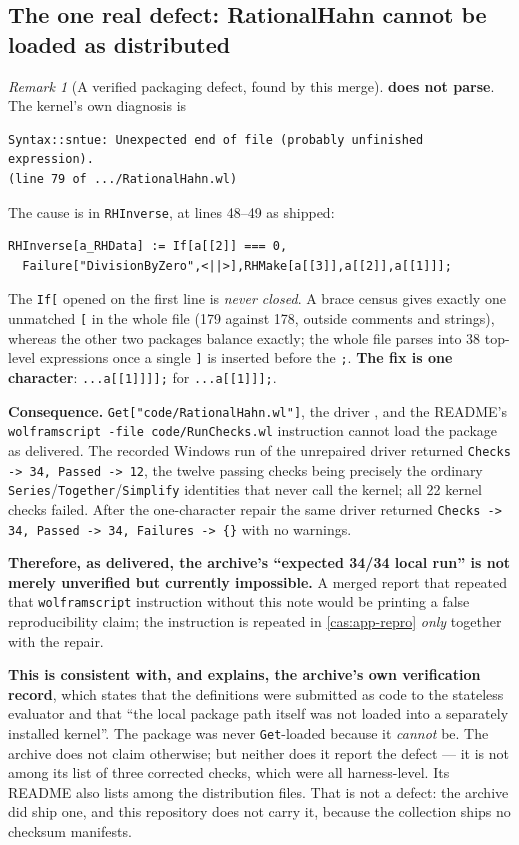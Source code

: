 \documentclass[11pt,letterpaper]{article}
\numberwithin{equation}{section}
\theoremstyle{definition}
\theoremstyle{remark}
\newtheorem{remark}[theorem]{Remark}
\begin{document}
\subsection{The one real defect: RationalHahn cannot be loaded as distributed}
\label{cas:sub-defect}
\begin{remark}[A verified packaging defect, found by this merge]
\label{cas:rem-defect}
 \textbf{does not parse}. The kernel's own diagnosis is
\begin{lstlisting}
Syntax::sntue: Unexpected end of file (probably unfinished expression).
(line 79 of .../RationalHahn.wl)
\end{lstlisting}
The cause is in \texttt{RHInverse}, at lines 48--49 as shipped:
\begin{lstlisting}
RHInverse[a_RHData] := If[a[[2]] === 0,
  Failure["DivisionByZero",<||>],RHMake[a[[3]],a[[2]],a[[1]]];
\end{lstlisting}
The \texttt{If[} opened on the first line is \emph{never closed}. A brace census
gives exactly one unmatched \texttt{[} in the whole file (179 against 178,
outside comments and strings), whereas the other two packages balance exactly;
the whole file parses into 38 top-level expressions once a single \texttt{]} is
inserted before the \texttt{;}. \textbf{The fix is one character}:
\texttt{...a[[1]]]];} for \texttt{...a[[1]]];}.

\textbf{Consequence.} \texttt{Get["code/RationalHahn.wl"]}, the driver
, and the README's
\texttt{wolframscript -file code/RunChecks.wl} instruction cannot load the
package as delivered. The recorded Windows run of the unrepaired driver returned
\texttt{Checks -> 34, Passed -> 12}, the twelve passing checks being precisely
the ordinary \texttt{Series}/\texttt{Together}/\texttt{Simplify} identities that
never call the kernel; all 22 kernel checks failed. After the one-character
repair the same driver returned \texttt{Checks -> 34, Passed -> 34, Failures ->
\{\}} with no warnings.

\textbf{Therefore, as delivered, the archive's ``expected 34/34 local run'' is
not merely unverified but currently impossible.} A merged report that repeated
that \texttt{wolframscript} instruction without this note would be printing a
false reproducibility claim; the instruction is repeated in
\cref{cas:app-repro} \emph{only} together with the repair.

\textbf{This is consistent with, and explains, the archive's own verification
record}, which states that the definitions were submitted as code to the
stateless evaluator and that ``the local package path itself was not loaded into
a separately installed kernel''. The package was never \texttt{Get}-loaded
because it \emph{cannot} be. The archive does not claim otherwise; but neither
does it report the defect --- it is not among its list of three corrected
checks, which were all harness-level. Its README also lists
 among the distribution files. That is not a defect: the
archive did ship one, and this repository does not carry it, because the
collection ships no checksum manifests.


\end{remark}
\end{document}
